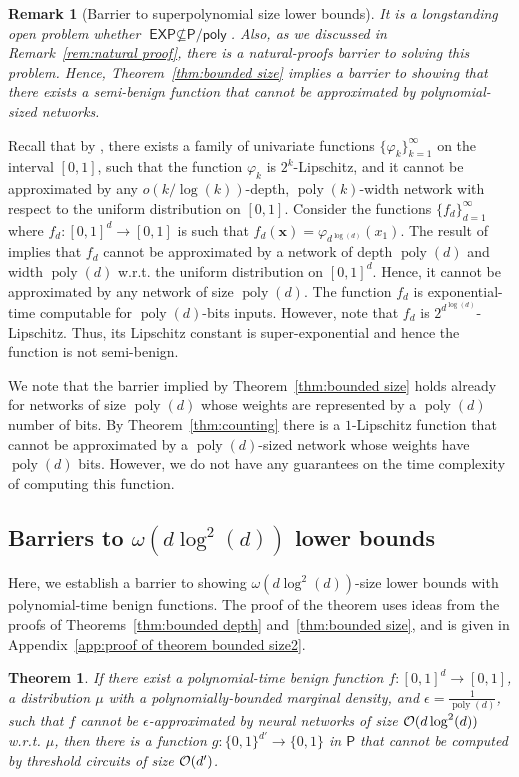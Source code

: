 \documentclass[11pt]{article}
\newtheorem{theorem}{Theorem}[section]
\newtheorem{remark}{Remark}[section]
\newcommand{\bx}{\mathbf{x}}
\newcommand{\co}{{\cal O}}
\DeclareMathOperator{\poly}{poly}
\newcommand{\Ppoly}{\textsf{P/poly}}
\newcommand{\Ptime}{\textsf{P}}
\newcommand{\EXP}{\textsf{EXP}}
\begin{document}
\begin{remark}[Barrier to superpolynomial size lower bounds]
	It is a longstanding open problem whether $\EXP \not \subseteq \Ppoly$. Also, as we discussed in Remark~\ref{rem:natural proof}, there is a natural-proofs barrier to solving this problem. 
	Hence, Theorem~\ref{thm:bounded size} implies a barrier to showing that there exists a semi-benign function that cannot be approximated by polynomial-sized networks.
\end{remark}

Recall that by \cite{telgarsky2016benefits}, there exists a family of univariate functions $\{\varphi_k\}_{k=1}^\infty$ on the interval $[0,1]$, such that the function $\varphi_k$ is $2^k$-Lipschitz, 
and it cannot be approximated by any $o(k/\log(k))$-depth, $\poly(k)$-width network with respect to the uniform distribution on $[0,1]$.
Consider the functions $\{f_d\}_{d=1}^\infty$ where $f_d:[0,1]^d \rightarrow [0,1]$ is such that $f_d(\bx) = \varphi_{d^{\log(d)}}(x_1)$. The result of \cite{telgarsky2016benefits} implies that $f_d$ cannot be approximated by a network of depth $\poly(d)$ and width $\poly(d)$ w.r.t. the uniform distribution on $[0,1]^d$. Hence, it cannot be approximated by any network of size $\poly(d)$. The function $f_d$ is exponential-time computable for $\poly(d)$-bits inputs. However, note that $f_d$ is $2^{d^{\log(d)}}$-Lipschitz. Thus, its Lipschitz constant is super-exponential and hence the function is not semi-benign.

We note that the barrier implied by Theorem~\ref{thm:bounded size} holds already for networks of size $\poly(d)$ whose weights are represented by a $\poly(d)$ number of bits.
By Theorem~\ref{thm:counting} there is a $1$-Lipschitz function that cannot be approximated by a $\poly(d)$-sized network whose weights have $\poly(d)$ bits. However, we do not have any guarantees on the time complexity of computing this function.

\subsection{Barriers to $\omega(d \log^2(d))$ lower bounds}

Here, we establish a barrier to showing $\omega(d \log^2(d))$-size lower bounds with polynomial-time benign functions. 
The proof of the theorem uses ideas from the proofs of Theorems~\ref{thm:bounded depth} and~\ref{thm:bounded size}, and is given in Appendix~\ref{app:proof of theorem bounded size2}. 
\begin{theorem}
\label{thm:bounded size2}
	If there exist a polynomial-time benign function $f:[0,1]^d \rightarrow [0,1]$, a distribution $\mu$ with a polynomially-bounded marginal density, and $\epsilon=\frac{1}{\poly(d)}$, such that $f$ cannot be $\epsilon$-approximated by neural networks of size $\co(d \log^2(d))$ w.r.t. $\mu$, then there is a function $g:\{0,1\}^{d'} \rightarrow \{0,1\}$ in $\Ptime$ that cannot be computed by threshold circuits of size $\co(d')$.
\end{theorem}
\end{document}
